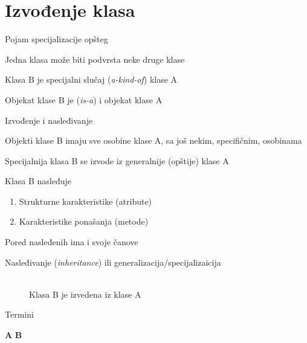\documentclass{article}
\newenvironment{xitemize}{%
    
    \itemize
    \larger
}{%
    \enditemize
}
\let\olditemize\itemize
\let\endolditemize\enditemize
\renewenvironment{itemize}{%
    \smaller
    \olditemize
}{%
    \endolditemize
}
\begin{document}
\section{Izvođenje klasa}
\begin{xitemize}
\item Pojam specijalizacije opšteg
\begin{itemize}
    \item Jedna klasa može biti podvrsta neke druge klase
    \item Klasa B je specijalni slučaj (\textit{a-kind-of}) klase A
    \item Objekat klase B je (\textit{is-a}) i objekat klase A
\end{itemize}
\item Izvođenje i nasleđivanje
\begin{itemize}
    \item Objekti klase B imaju sve osobine klase A, sa još nekim, specifičnim, osobinama
    \item Specijalnija klasa B se izvode iz generalnije (opštije) klase A
    \item Klasa B nasleđuje
    \begin{enumerate}
        \item Strukturne karakteristike (atribute)
        \item Karakteristike ponašanja (metode)
    \end{enumerate}
    \item Pored nasleđenih ima i svoje čanove
    \item Nasleđivanje (\textit{inheritance}) ili generalizacija/specijalizaicija\\\\
    \begin{figure}[h]
    \centering
    \caption{Klasa B je izvedena iz klase A} 
    \end{figure}
    \item Termini
    \item[] \hspace{0.8cm}\textbf{A} \hspace{1.8cm}\textbf{B}
    \begin{enumerate}

\end{enumerate}
\end{itemize}
\end{xitemize}
\end{document}
